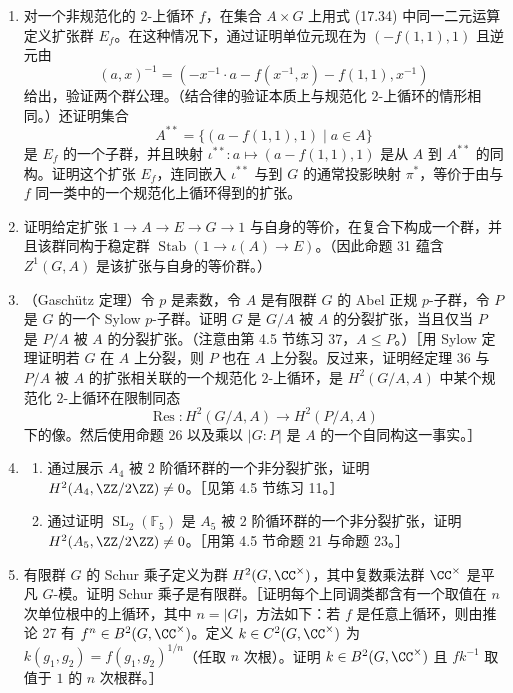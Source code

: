 \begin{enumerate}
  \item 对一个非规范化的 $2$-上循环 $f$，在集合 $A\times G$ 上用式 (17.34) 中同一二元运算定义扩张群 $E_f$。在这种情况下，通过证明单位元现在为 $(-f(1,1),1)$ 且逆元由
  \[
    (a,x)^{-1}=(-x^{-1}\cdot a-f(x^{-1},x)-f(1,1),x^{-1})
  \]
  给出，验证两个群公理。（结合律的验证本质上与规范化 $2$-上循环的情形相同。）还证明集合
  \[
    A^{**}=\{(a-f(1,1),1)\mid a\in A\}
  \]
  是 $E_f$ 的一个子群，并且映射 $\iota^{**}:a\mapsto(a-f(1,1),1)$ 是从 $A$ 到 $A^{**}$ 的同构。证明这个扩张 $E_f$，连同嵌入 $\iota^{**}$ 与到 $G$ 的通常投影映射 $\pi^*$，等价于由与 $f$ 同一类中的一个规范化上循环得到的扩张。

  \item 证明给定扩张 $1\to A\to E\to G\to1$ 与自身的等价，在复合下构成一个群，并且该群同构于稳定群 $\operatorname{Stab}(1\to\iota(A)\to E)$。（因此命题 31 蕴含 $Z^1(G,A)$ 是该扩张与自身的等价群。）

  \item （Gaschütz 定理）令 $p$ 是素数，令 $A$ 是有限群 $G$ 的 Abel 正规 $p$-子群，令 $P$ 是 $G$ 的一个 Sylow $p$-子群。证明 $G$ 是 $G/A$ 被 $A$ 的分裂扩张，当且仅当 $P$ 是 $P/A$ 被 $A$ 的分裂扩张。（注意由第 4.5 节练习 37，$A\leq P$。）［用 Sylow 定理证明若 $G$ 在 $A$ 上分裂，则 $P$ 也在 $A$ 上分裂。反过来，证明经定理 36 与 $P/A$ 被 $A$ 的扩张相关联的一个规范化 $2$-上循环，是 $H^2(G/A,A)$ 中某个规范化 $2$-上循环在限制同态
  \[
    \operatorname{Res}:H^2(G/A,A)\to H^2(P/A,A)
  \]
  下的像。然后使用命题 26 以及乘以 $|G:P|$ 是 $A$ 的一个自同构这一事实。］

  \item
  \begin{enumerate}[label=(\alph*)]
    \item 通过展示 $A_4$ 被 $2$ 阶循环群的一个非分裂扩张，证明 $H^2(A_4,\ZZ/2\ZZ)\neq0$。［见第 4.5 节练习 11。］
    \item 通过证明 $\operatorname{SL}_2(\mathbb F_5)$ 是 $A_5$ 被 $2$ 阶循环群的一个非分裂扩张，证明 $H^2(A_5,\ZZ/2\ZZ)\neq0$。［用第 4.5 节命题 21 与命题 23。］
  \end{enumerate}

  \item 有限群 $G$ 的 Schur 乘子定义为群 $H^2(G,\CC^\times)$，其中复数乘法群 $\CC^\times$ 是平凡 $G$-模。证明 Schur 乘子是有限群。［证明每个上同调类都含有一个取值在 $n$ 次单位根中的上循环，其中 $n=|G|$，方法如下：若 $f$ 是任意上循环，则由推论 27 有 $f^n\in B^2(G,\CC^\times)$。定义 $k\in C^2(G,\CC^\times)$ 为 $k(g_1,g_2)=f(g_1,g_2)^{1/n}$（任取 $n$ 次根）。证明 $k\in B^2(G,\CC^\times)$ 且 $fk^{-1}$ 取值于 $1$ 的 $n$ 次根群。］


\end{enumerate}
